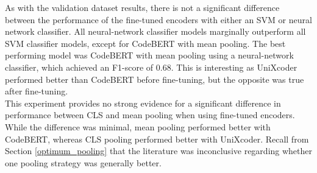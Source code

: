 

\noindent
As with the validation dataset results, there is not a significant difference between the performance of the fine-tuned encoders with either an SVM or neural network classifier. All neural-network classifier models marginally outperform all SVM classifier models, except for CodeBERT with mean pooling. The best performing model was CodeBERT with mean pooling using a neural-network classifier, which achieved an F1-score of $0.68$. This is interesting as UniXcoder performed better than CodeBERT before fine-tuning, but the opposite was true after fine-tuning. \\


\noindent
This experiment provides no strong evidence for a significant difference in performance between CLS and mean pooling when using fine-tuned encoders. While the difference was minimal, mean pooling performed better with CodeBERT, whereas CLS pooling performed better with UniXcoder. Recall from Section \ref{optimum_pooling} that the literature was inconclusive regarding whether one pooling strategy was generally better. 

